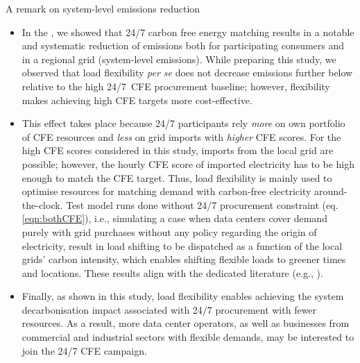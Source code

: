 \begin{frame}{A remark on system-level emissions reduction}

  {\footnotesize 
  \begin{itemize}
  \vspace{-0.2cm}
  \item  In the , we showed that 24/7 carbon free energy matching results in a \alert{notable and systematic reduction of emissions} both for participating consumers and in a regional grid (system-level emissions). While preparing this study, we observed that   load flexibility \textit{per se} does not decrease emissions further below relative to the high 24/7~CFE procurement baseline; however, flexibility makes achieving high CFE targets \alert{more cost-effective}.

  \item This effect takes place because 24/7 participants rely \textit{more} on own portfolio of CFE resources and \textit{less} on grid imports with \textit{higher} CFE scores.
  For the high CFE scores considered in this study, imports from the local grid are possible; however, the hourly CFE score of imported electricity has to be high enough to match the CFE target. 
  Thus, load flexibility is mainly used to optimise resources for matching demand with carbon-free electricity around-the-clock. 
  Test model runs done without 24/7 procurement constraint (eq. \ref{eqn:bothCFE}), i.e., simulating a case when data centers cover demand purely with grid purchases without any policy regarding the origin of electricity, result in load shifting to be dispatched \alert{as a function of the local grids' carbon intensity}, which enables shifting flexible loads to greener times and locations. 
  These results align with the dedicated literature (e.g., ).

  \item Finally, as shown in this study, load flexibility enables achieving the system decarbonisation impact associated with 24/7 procurement with \alert{fewer resources}.   As a result, more data center operators, as well as businesses from commercial and industrial sectors with flexible demands, may be interested to join the 24/7 CFE campaign.

  \end{itemize}
  }
\end{frame}




